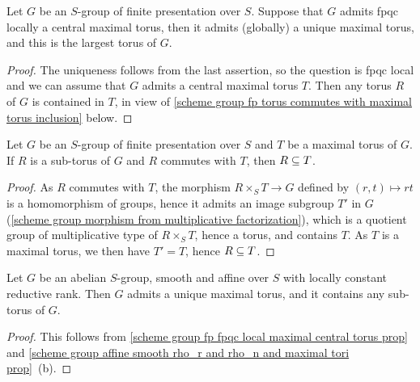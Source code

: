 \begin{proposition}\label{scheme group fp fpqc local maximal central torus prop}
Let $G$ be an $S$-group of finite presentation over $S$. Suppose that $G$ admits fpqc locally a central maximal torus, then it admits (globally) a unique maximal torus, and this is the largest torus of $G$. 
\end{proposition}
\begin{proof}
The uniqueness follows from the last assertion, so the question is fpqc local and we can assume that $G$ admits a central maximal torus $T$. Then any torus $R$ of $G$ is contained in $T$, in view of \cref{scheme group fp torus commutes with maximal torus inclusion} below.
\end{proof}

\begin{lemma}\label{scheme group fp torus commutes with maximal torus inclusion}
Let $G$ be an $S$-group of finite presentation over $S$ and $T$ be a maximal torus of $G$. If $R$ is a sub-torus of $G$ and $R$ commutes with $T$, then $R\subseteq T$.
\end{lemma}
\begin{proof}
As $R$ commutes with $T$, the morphism $R\times_ST\to G$ defined by $(r,t)\mapsto rt$ is a homomorphism of groups, hence it admits an image subgroup $T'$ in $G$ (\cref{scheme group morphism from multiplicative factorization}), which is a quotient group of multiplicative type of $R\times_ST$, hence a torus, and contains $T$. As $T$ is a maximal torus, we then have $T'=T$, hence $R\subseteq T$.
\end{proof}

\begin{corollary}\label{scheme group smooth abelian affine rho_r constant maximal torus}
Let $G$ be an abelian $S$-group, smooth and affine over $S$ with locally constant reductive rank. Then $G$ admits a unique maximal torus, and it contains any sub-torus of $G$.
\end{corollary}
\begin{proof}
This follows from \cref{scheme group fp fpqc local maximal central torus prop} and \cref{scheme group affine smooth rho_r and rho_n and maximal tori prop}~(b).
\end{proof}

